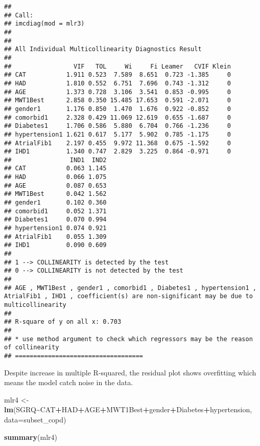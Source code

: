 \documentclass[
]{article}
\newenvironment{Shaded}{\begin{snugshade}}{\end{snugshade}}
\newcommand{\AttributeTok}[1]{\textcolor[rgb]{0.13,0.29,0.53}{#1}}
\newcommand{\FunctionTok}[1]{\textcolor[rgb]{0.13,0.29,0.53}{\textbf{#1}}}
\newcommand{\NormalTok}[1]{#1}
\newcommand{\OtherTok}[1]{\textcolor[rgb]{0.56,0.35,0.01}{#1}}
\newcommand{\SpecialCharTok}[1]{\textcolor[rgb]{0.81,0.36,0.00}{\textbf{#1}}}
\begin{document}
\begin{verbatim}
## 
## Call:
## imcdiag(mod = mlr3)
## 
## 
## All Individual Multicollinearity Diagnostics Result
## 
##                 VIF   TOL     Wi     Fi Leamer   CVIF Klein
## CAT           1.911 0.523  7.589  8.651  0.723 -1.385     0
## HAD           1.810 0.552  6.751  7.696  0.743 -1.312     0
## AGE           1.373 0.728  3.106  3.541  0.853 -0.995     0
## MWT1Best      2.858 0.350 15.485 17.653  0.591 -2.071     0
## gender1       1.176 0.850  1.470  1.676  0.922 -0.852     0
## comorbid1     2.328 0.429 11.069 12.619  0.655 -1.687     0
## Diabetes1     1.706 0.586  5.880  6.704  0.766 -1.236     0
## hypertension1 1.621 0.617  5.177  5.902  0.785 -1.175     0
## AtrialFib1    2.197 0.455  9.972 11.368  0.675 -1.592     0
## IHD1          1.340 0.747  2.829  3.225  0.864 -0.971     0
##                IND1  IND2
## CAT           0.063 1.145
## HAD           0.066 1.075
## AGE           0.087 0.653
## MWT1Best      0.042 1.562
## gender1       0.102 0.360
## comorbid1     0.052 1.371
## Diabetes1     0.070 0.994
## hypertension1 0.074 0.921
## AtrialFib1    0.055 1.309
## IHD1          0.090 0.609
## 
## 1 --> COLLINEARITY is detected by the test 
## 0 --> COLLINEARITY is not detected by the test
## 
## AGE , MWT1Best , gender1 , comorbid1 , Diabetes1 , hypertension1 , AtrialFib1 , IHD1 , coefficient(s) are non-significant may be due to multicollinearity
## 
## R-square of y on all x: 0.703 
## 
## * use method argument to check which regressors may be the reason of collinearity
## ===================================
\end{verbatim}

Despite increase in multiple R-squared, the residual plot shows
overfitting which means the model catch noise in the data.

\begin{Shaded}
\begin{Highlighting}[]
\NormalTok{mlr4 }\OtherTok{\textless{}{-}} \FunctionTok{lm}\NormalTok{(SGRQ}\SpecialCharTok{\textasciitilde{}}\NormalTok{CAT}\SpecialCharTok{+}\NormalTok{HAD}\SpecialCharTok{+}\NormalTok{AGE}\SpecialCharTok{+}\NormalTok{MWT1Best}\SpecialCharTok{+}\NormalTok{gender}\SpecialCharTok{+}\NormalTok{Diabetes}\SpecialCharTok{+}\NormalTok{hypertension, }\AttributeTok{data=}\NormalTok{subset\_copd)}
\end{Highlighting}
\end{Shaded}

\begin{Shaded}
\begin{Highlighting}[]
\FunctionTok{summary}\NormalTok{(mlr4)}
\end{Highlighting}
\end{Shaded}
\end{document}
